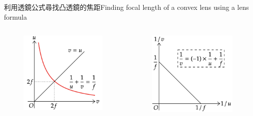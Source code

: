 \documentclass[beamer=true]{standalone}
\begin{document}
\begin{frame}{利用透鏡公式尋找凸透鏡的焦距Finding focal length of a convex lens using a lens formula}
    \begin{columns}
        \begin{figure}
            \centering
            \includegraphics[width=\linewidth]{../../assets/dun98d89382d32.png}
        \end{figure}
        \begin{figure}
            \centering
            \includegraphics[width=\linewidth]{../../assets/dqwdqwjddge.png}
        \end{figure}
    \end{columns}
\end{frame}
\end{document}
